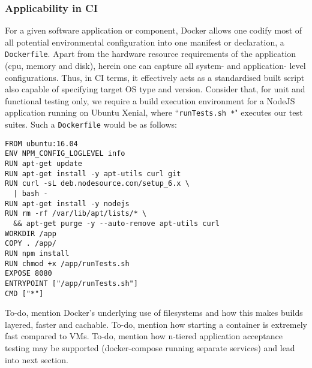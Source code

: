 \documentclass{report}
\begin{document}
\subsubsection{Applicability in CI}
For a given software application or component, Docker allows
one codify most of all potential environmental configuration
into one manifest or declaration, a \texttt{Dockerfile}. Apart from the
hardware resource requirements of the application (cpu, memory and disk), 
herein one can capture all system- and application- level configurations. Thus,
in CI terms, it effectively acts as a standardised built 
script also capable of specifying target OS type and version.
Consider that, for unit and functional testing only, we require a build execution environment
for a NodeJS application running on Ubuntu Xenial, where ``\texttt{runTests.sh *}" executes our test suites.
Such a \texttt{Dockerfile} would be as follows:
\begin{verbatim}
FROM ubuntu:16.04 
ENV NPM_CONFIG_LOGLEVEL info
RUN apt-get update
RUN apt-get install -y apt-utils curl git
RUN curl -sL deb.nodesource.com/setup_6.x \
  | bash -
RUN apt-get install -y nodejs 
RUN rm -rf /var/lib/apt/lists/* \
  && apt-get purge -y --auto-remove apt-utils curl
WORKDIR /app
COPY . /app/
RUN npm install
RUN chmod +x /app/runTests.sh
EXPOSE 8080
ENTRYPOINT ["/app/runTests.sh"]
CMD ["*"]
\end{verbatim}
\par 
To-do, mention Docker's underlying use of filesystems and how this 
makes builds layered, faster and cachable. To-do, mention how
starting a container is extremely fast compared to VMs. To-do, 
mention how n-tiered application acceptance testing may be
supported (docker-compose running separate services) and lead into next section.

\end{document}
